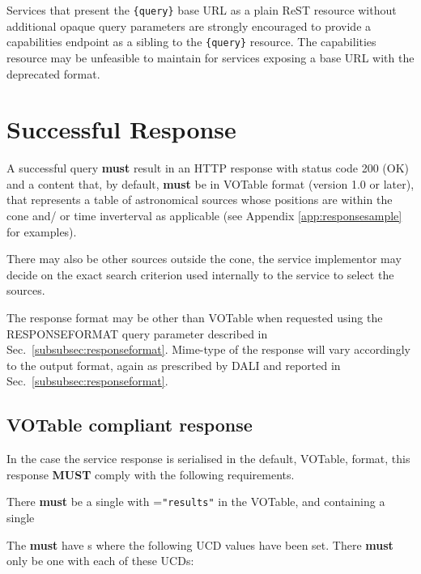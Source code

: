 \documentclass[11pt,a4paper]{ivoa}
\begin{document}
Services that present the \texttt{\{query\}} base URL as a plain ReST
resource without additional opaque query parameters are strongly
encouraged to provide a capabilities endpoint as a sibling to the
\texttt{\{query\}} resource. The capabilities resource may be unfeasible
to maintain for services exposing a base URL with the deprecated format.

\section{Successful Response} \label{sec:response} A successful query
\textbf{must} result in an HTTP response with status code 200 (OK) and a
content that, by default, \textbf{must} be in VOTable format (version
1.0 or later), that represents a table of astronomical sources whose
positions are within the cone and/ or time inverterval as applicable
(see Appendix \ref{app:responsesample} for examples).

There may also be other sources outside the cone, the service
implementor may decide on the exact search criterion used internally to
the service to select the sources.

The response format may be other than VOTable when requested using the
RESPONSEFORMAT query parameter described in
Sec.~\ref{subsubsec:responseformat}. Mime-type of the response will vary
accordingly to the output format, again as prescribed by DALI and
reported in Sec.~\ref{subsubsec:responseformat}.

\subsection{VOTable compliant response}

In the case the service response is serialised in the default, VOTable,
format, this response \textbf{MUST} comply with the following
requirements.

There \textbf{must} be a single  with
=\texttt{"results"} in
the VOTable, and containing a single 

The  \textbf{must} have s where the following
UCD values have been set. There \textbf{must} only be one 
with each of these UCDs: 
\end{document}
